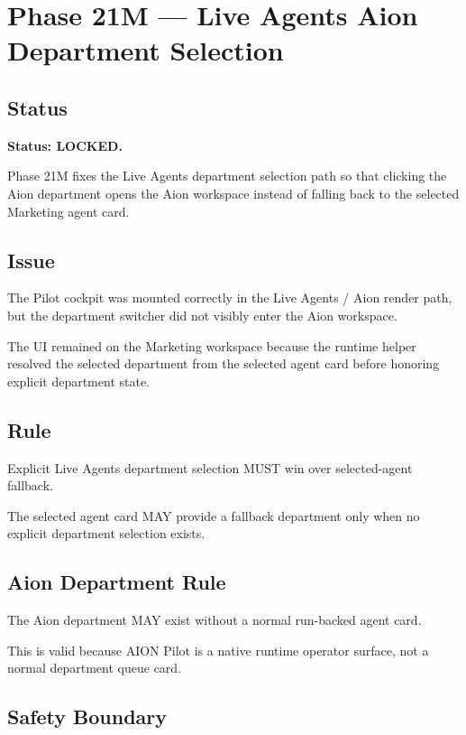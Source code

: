 \section{Phase 21M --- Live Agents Aion Department Selection}
\label{sec:aion-phase21m-live-agents-aion-department-selection}

\subsection{Status}

\textbf{Status: LOCKED.}

Phase 21M fixes the Live Agents department selection path so that clicking the Aion department opens the Aion workspace instead of falling back to the selected Marketing agent card.

\subsection{Issue}

The Pilot cockpit was mounted correctly in the Live Agents / Aion render path, but the department switcher did not visibly enter the Aion workspace.

The UI remained on the Marketing workspace because the runtime helper resolved the selected department from the selected agent card before honoring explicit department state.

\subsection{Rule}

Explicit Live Agents department selection MUST win over selected-agent fallback.

The selected agent card MAY provide a fallback department only when no explicit department selection exists.

\subsection{Aion Department Rule}

The Aion department MAY exist without a normal run-backed agent card.

This is valid because AION Pilot is a native runtime operator surface, not a normal department queue card.

\subsection{Safety Boundary}


